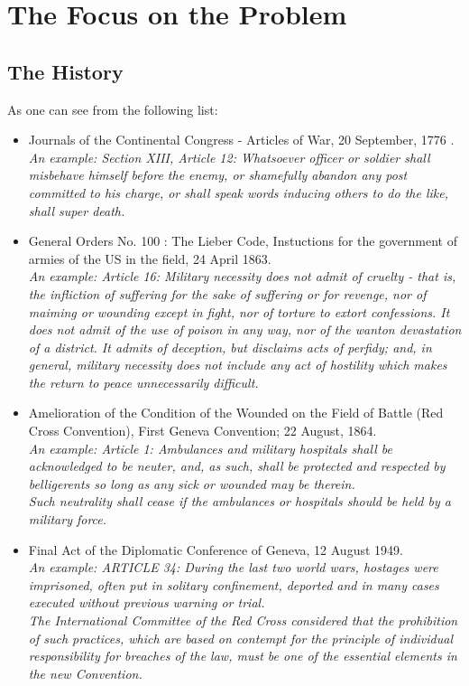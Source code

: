 \chapter{The Focus on the Problem}

\section{The History}

As one can see from the following list:
\begin{itemize}
\setlength{\itemsep}{0.05\baselineskip}
    \item Journals of the Continental Congress - Articles of War, 20 September, 1776 . \cite{ArticlesOfWar1775:online}\\
    \textit{An example: Section XIII, Article 12: Whatsoever officer or soldier shall misbehave himself before the enemy, or shamefully abandon any post committed to his charge, or shall speak words inducing others to do the like, shall super death.}
    \item General Orders No. 100 : The Lieber Code, Instuctions for the government of armies of the US in the field, 24 April 1863. \cite{LiberCode1863:online}\\
    \textit{An example: Article 16: Military necessity does not admit of cruelty - that is, the infliction of suffering for the sake of suffering or for revenge, nor of maiming or wounding except in fight, nor of torture to extort confessions. It does not admit of the use of poison in any way, nor of the wanton devastation of a district. It admits of deception, but disclaims acts of perfidy; and, in general, military necessity does not include any act of hostility which makes the return to peace unnecessarily difficult. }
    \item Amelioration of the Condition of the Wounded on the Field of Battle (Red Cross Convention), First Geneva Convention; 22 August, 1864. \cite{1stGenevaConvention1864:online}\\
    \textit{An example: Article 1: Ambulances and military hospitals shall be acknowledged to be neuter, and, as such, shall be protected and respected by belligerents so long as any sick or wounded may be therein.\\
    Such neutrality shall cease if the ambulances or hospitals should be held by a military force. }
    \item Final Act of the Diplomatic Conference of Geneva, 12 August 1949. \cite{FinalGenevaConvention1949:online}\\
    \textit{An example: ARTICLE 34: During the last two world wars, hostages were imprisoned, often put in solitary confinement, deported and in many cases executed without previous warning or trial.\\
    The International Committee of the Red Cross considered that the prohibition of such practices, which are based on contempt for the principle of individual responsibility for breaches of the law, must be one of the essential elements in the new Convention.}
\end{itemize}
